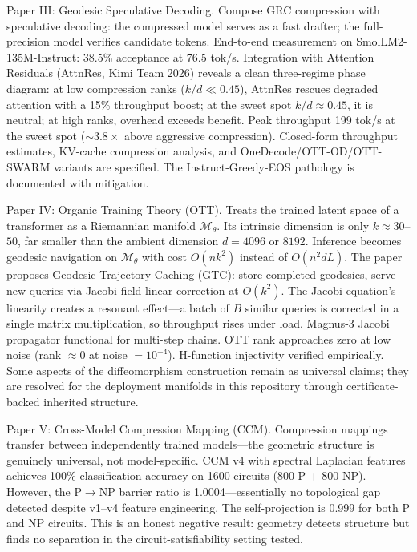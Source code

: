 \documentclass[11pt]{article}
\begin{document}
Paper III: Geodesic Speculative Decoding. Compose GRC compression with speculative decoding: the compressed model serves as a fast drafter; the full-precision model verifies candidate tokens. End-to-end measurement on SmolLM2-135M-Instruct: 38.5\% acceptance at 76.5 tok/s. Integration with Attention Residuals (AttnRes, Kimi Team 2026) reveals a clean three-regime phase diagram: at low compression ranks ($k/d \ll 0.45$), AttnRes rescues degraded attention with a 15\% throughput boost; at the sweet spot $k/d \approx 0.45$, it is neutral; at high ranks, overhead exceeds benefit. Peak throughput 199 tok/s at the sweet spot ($\sim 3.8\times$ above aggressive compression). Closed-form throughput estimates, KV-cache compression analysis, and OneDecode/OTT-OD/OTT-SWARM variants are specified. The Instruct-Greedy-EOS pathology is documented with mitigation.

Paper IV: Organic Training Theory (OTT). Treats the trained latent space of a transformer as a Riemannian manifold $\mathcal{M}_\theta$. Its intrinsic dimension is only $k \approx 30$--$50$, far smaller than the ambient dimension $d = 4096$ or $8192$. Inference becomes geodesic navigation on $\mathcal{M}_\theta$ with cost $O(n k^2)$ instead of $O(n^2 d L)$. The paper proposes Geodesic Trajectory Caching (GTC): store completed geodesics, serve new queries via Jacobi-field linear correction at $O(k^2)$. The Jacobi equation's linearity creates a resonant effect---a batch of $B$ similar queries is corrected in a single matrix multiplication, so throughput rises under load. Magnus-3 Jacobi propagator functional for multi-step chains. OTT rank approaches zero at low noise (rank $\approx 0$ at noise $= 10^{-4}$). H-function injectivity verified empirically. Some aspects of the diffeomorphism construction remain as universal claims; they are resolved for the deployment manifolds in this repository through certificate-backed inherited structure.

Paper V: Cross-Model Compression Mapping (CCM). Compression mappings transfer between independently trained models---the geometric structure is genuinely universal, not model-specific. CCM v4 with spectral Laplacian features achieves 100\% classification accuracy on 1600 circuits (800 P + 800 NP). However, the P$\rightarrow$NP barrier ratio is 1.0004---essentially no topological gap detected despite v1--v4 feature engineering. The self-projection is 0.999 for both P and NP circuits. This is an honest negative result: geometry detects structure but finds no separation in the circuit-satisfiability setting tested.
\end{document}
